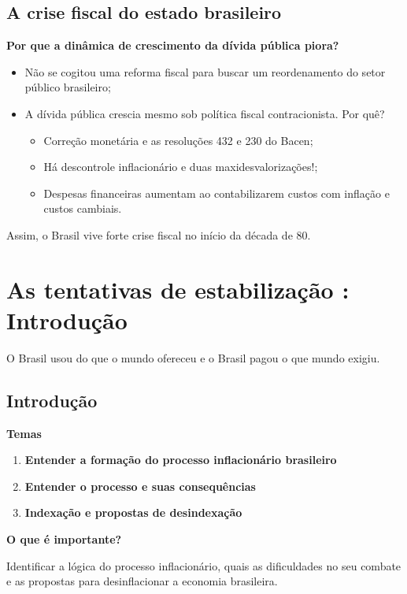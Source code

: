 \documentclass[a4paper,12pt]{article}[abntex2]
\begin{document}
\subsection{\textbf{A crise fiscal do estado brasileiro}}

\textbf{Por que a dinâmica de crescimento da dívida pública piora?}
\begin{itemize}
    \item Não se cogitou uma reforma fiscal para buscar um reordenamento do setor público brasileiro;
    \item A dívida pública crescia mesmo sob política fiscal contracionista. Por quê?
    \begin{itemize}
        \item Correção monetária e as resoluções 432 e 230 do Bacen;
        \item Há descontrole inflacionário e duas maxidesvalorizações!;
        \item Despesas financeiras aumentam ao contabilizarem custos com inflação e custos cambiais.
    \end{itemize}
\end{itemize}

Assim, o Brasil vive forte crise fiscal no início da década de 80.

\newpage
\section{\textbf{As tentativas de estabilização : Introdução}}

O Brasil usou do que o mundo ofereceu e o Brasil pagou o que mundo exigiu.

\subsection{\textbf{Introdução}}
\textbf{Temas}\begin{enumerate}
    \item \textbf{Entender a formação do processo inflacionário brasileiro}
    \item \textbf{Entender o processo e suas consequências}
    \item \textbf{Indexação e propostas de desindexação}
\end{enumerate}

\textbf{O que é importante?}

Identificar a lógica do processo inflacionário, quais as dificuldades no seu combate e as propostas para desinflacionar a economia brasileira.
\end{document}

